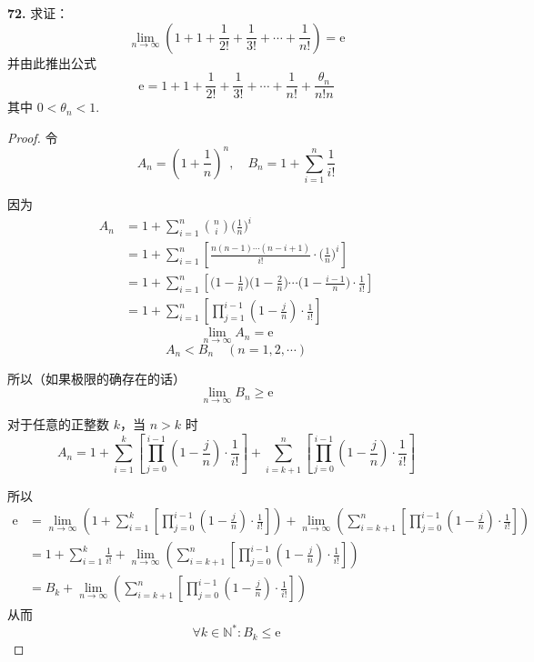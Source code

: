 \textbf{72.} 求证：
\[\lim_{n \rightarrow \infty} \left(1 + 1 + \frac{1}{2!} + \frac{1}{3!} + \cdots + \frac{1}{n!}\right) = \mathrm{e} \tag{72.1}\]
并由此推出公式
\[\mathrm{e} = 1 + 1 + \frac{1}{2!} + \frac{1}{3!} + \cdots + \frac{1}{n!} + \frac{\theta_n}{n!n} \tag{72.2}\]
其中 $0 < \theta_n < 1$.
\begin{proof}
    令
    \[A_n = \left(1 + \frac{1}{n}\right)^n, \quad B_n = 1 + \sum_{i=1}^{n} \frac{1}{i!} \tag{72.3}\]

    因为
    \begin{align*}
        A_n &= 1 + \sum_{i=1}^{n} {n \choose i} \biggl(\frac{1}{n}\biggr)^i\\
        &= 1 + \sum_{i=1}^{n} \left[ \frac{n(n-1)\cdots (n-i+1)}{i!} \cdot \biggl(\frac{1}{n}\biggr)^i\right]\\
        &= 1 + \sum_{i=1}^{n} \left[\biggl(1 - \frac{1}{n}\biggr)\biggl(1 - \frac{2}{n}\biggr) \cdots \biggl(1 - \frac{i-1}{n}\biggr) \cdot \frac{1}{i!}\right]\\
        &= 1 + \sum_{i=1}^{n} \left[\prod_{j=1}^{i-1} \left(1 - \frac{j}{n}\right) \cdot \frac{1}{i!}\right]
    \end{align*}
    \[\lim_{n \rightarrow \infty}A_n = \mathrm{e}\]
    \[A_n < B_n \quad (n=1,2,\cdots)\]

    所以（如果极限的确存在的话）
    \[\lim_{n \rightarrow \infty}B_n \geqslant \mathrm{e} \tag{72.4}\]

    对于任意的正整数 $k$，当 $n > k$ 时
    \[A_n = 1 + \sum_{i=1}^{k}\left[\prod_{j=0}^{i-1}\left(1 - \frac{j}{n}\right) \cdot \frac{1}{i!}\right] + \sum_{i=k+1}^{n}\left[\prod_{j=0}^{i-1}\left(1 - \frac{j}{n}\right) \cdot \frac{1}{i!}\right]\]

    所以
    \begin{align*}
        \mathrm{e} &= \lim_{n \rightarrow \infty} \left(1 + \sum_{i=1}^{k}\left[\prod_{j=0}^{i-1}\left(1 - \frac{j}{n}\right) \cdot \frac{1}{i!}\right]\right) + \lim_{n \rightarrow \infty}\left(\sum_{i=k+1}^{n}\left[\prod_{j=0}^{i-1}\left(1 - \frac{j}{n}\right) \cdot \frac{1}{i!}\right]\right)\\
        &= 1 + \sum_{i=1}^{k}\frac{1}{i!} + \lim_{n \rightarrow \infty}\left(\sum_{i=k+1}^{n}\left[\prod_{j=0}^{i-1}\left(1 - \frac{j}{n}\right) \cdot \frac{1}{i!}\right]\right)\\
        &= B_k + \lim_{n \rightarrow \infty}\left(\sum_{i=k+1}^{n}\left[\prod_{j=0}^{i-1}\left(1 - \frac{j}{n}\right) \cdot \frac{1}{i!}\right]\right)
    \end{align*}
    从而
    \[\forall k \in \mathbb{N}^*: B_k \leqslant \mathrm{e} \tag{72.5}\]


\end{proof}
